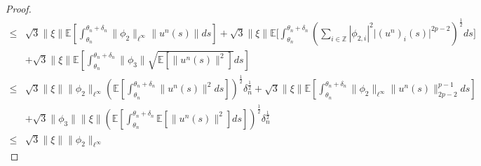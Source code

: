 \documentclass[11pt]{article}
\numberwithin{equation}{section}
\theoremstyle{plain}
\begin{document}
\begin{proof}
\begin{align}
  \le & \sqrt{3} \| \xi \| 
           \mathbb{E}
                  \left[ \int_{\theta_n}^{\theta_n + \delta_n} 
                               \| \phi_2 \|_{\ell^\infty} \| u^n(s) \| ds
                  \right]  
            + \sqrt{3} \| \xi \| 
                    \mathbb{E}
                           \bigg[ \int_{\theta_n}^{\theta_n + \delta_n}
                                                \left( \sum_{i \in \mathbb{Z} } 
                                                                  | \phi_{2,i} |^{2}
                                                                  \big| (u^n)_i(s) \big|^{2p-2} 
                                               \right)^{\frac{1}{2} }
                                       ds
                            \bigg]  \nonumber\\
        & + \sqrt{3} \| \xi \| 
                     \mathbb{E}
                            \left[ \int_{\theta_n}^{\theta_n + \delta_n}
                                             \|\phi_{3}\| 
                                             \sqrt{\mathbb{E} \left[ \| u^n(s) \|^2\right] }                                    
                                        ds 
                             \right]  \nonumber \\  
  \le & \sqrt{3} \| \xi \|  \| \phi_2 \|_{\ell^\infty}
           \left( \mathbb{E}
                           \left[ \int_{\theta_n}^{\theta_n + \delta_n} 
                                    \| u^n(s) \|^2 ds
                           \right] 
           \right)^{\frac{1}{2} }
           \delta_n^{\frac{1}{2} } 
           + \sqrt{3} \| \xi \| 
                    \mathbb{E}
                           \left[ \int_{\theta_n}^{\theta_n + \delta_n}
                                             \| \phi_{2} \|_{\ell^\infty}
                                             \| u^n(s) \|_{2p-2}^{p - 1}                        
                                         ds
                           \right]  \nonumber\\
       & + \sqrt{3} \|\phi_{3}\| \| \xi \| 
                    \left( \mathbb{E}
                                        \left[ \int_{\theta_n}^{\theta_n + \delta_n}
                                                      \mathbb{E} \left[ \| u^n(s) \|^2\right]                                 
                                                  ds 
                                        \right]
                     \right)^{\frac{1}{2} } 
                     \delta_n^{\frac{1}{2} }  \nonumber\\  
  \le & \sqrt{3} \| \xi \|  \| \phi_2 \|_{\ell^\infty}

\end{align}
\end{proof}
\end{document}
